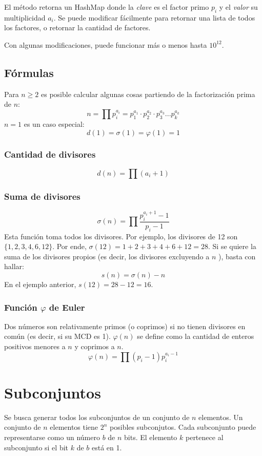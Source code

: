 \documentclass{article}
\begin{document}
\begin{multicols}{2}
	El método retorna un HashMap donde la \emph{clave} es el factor primo \( p_{i} \) y el \emph{valor} su multiplicidad \( a_{i} \). Se puede modificar fácilmente para retornar una lista de todos los factores, o retornar la cantidad de factores.
	
	Con algunas modificaciones, puede funcionar más o menos hasta \( 10^{12} \).
	
	
	\subsection{Fórmulas}
	Para \( n \geq 2 \) es posible calcular algunas cosas partiendo de la factorización prima de \( n \):
	\[ n = \prod p_{i}^{a_{i}} = p_{1}^{a_{1}} \cdot p_{2}^{a_{2}} \cdot p_{3}^{a_{3}} ...  p_{k}^{a_{k}} \]
	\( n = 1 \) es un caso especial:
	\[ d(1) = \sigma (1) = \varphi (1) = 1 \]

		\subsubsection{Cantidad de divisores}
		\[ d(n) = \prod (a_{i} + 1) \]
		
		\subsubsection{Suma de divisores}
		\[ 
			\sigma (n) = \prod \frac{p_{i}^{a_{i} + 1} - 1}{p_{i} - 1}
		\]
		Esta función toma todos los divisores. Por ejemplo, los divisores de 12 son \( \{1, 2, 3, 4, 6, 12\} \). Por ende, \( \sigma(12) = 1+2+3+4+6+12 = 28 \). Si se quiere la suma de los divisores propios (es decir, los divisores excluyendo a \( n \) ), basta con hallar:
		\[ 
			s (n) = \sigma (n) - n
		\]		
		En el ejemplo anterior, \( s (12) = 28-12 = 16 \).
		
		\subsubsection{Función $\varphi$ de Euler}
		Dos números son relativamente primos (o coprimos) si no tienen divisores en común (es decir, si su MCD es 1). \( \varphi (n) \) se define como la cantidad de enteros positivos menores a \( n \) y coprimos a \( n \). 
		\[ 
			\varphi (n) = \prod (p_{i} - 1) p_{i}^{a_{i}-1}
		\]		
		
\section{Subconjuntos}
Se busca generar todos los subconjuntos de un conjunto de \( n \) elementos. Un conjunto de \( n \) elementos tiene \( 2^{n} \) posibles subconjutos. Cada subconjunto puede representarse como un número \( b \) de \( n \) bits. El elemento \( k \) pertenece al subconjunto si el bit \( k \) de \( b \) está en 1.


\end{multicols}
\end{document}
